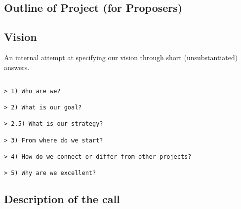 \begin{draft}
\section*{Outline of Project (for Proposers)}


\subsection*{Vision}

An internal attempt at specifying our vision through short
(unsubstantiated) answers.

\begin{verbatim}

> 1) Who are we?

> 2) What is our goal?

> 2.5) What is our strategy?

> 3) From where do we start?

> 4) How do we connect or differ from other projects?

> 5) Why are we excellent?

\end{verbatim}





\subsection*{Description of the call}




\renewcommand{\thepage}{\arabic{page}}
\setcounter{page}{1}
\black
\cleardoublepage
\end{draft}


